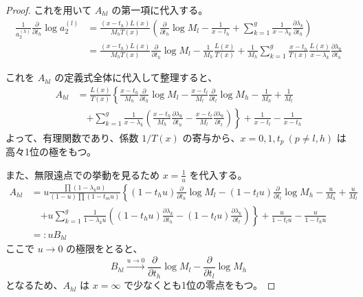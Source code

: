 \documentclass[paper=a4, fontsize=11pt]{jlreq} %
\newenvironment{story}{%
  \begin{mdframed}[
    backgroundcolor=red!5, %
    linewidth=0pt,         %
    innertopmargin=10pt,   %
    innerbottommargin=10pt,
    innerrightmargin=10pt, %
    innerleftmargin=10pt
  ]%
}{%
  \end{mdframed}%
}
\theoremstyle{break}
\theoremstyle{qa}
\begin{document}
\begin{story}
\begin{proof}
これを用いて $A_{hl}$ の第一項に代入する。
\begin{align*}
    \frac{1}{a_2^{(h)}} \frac{\partial}{\partial t_h} \log a_2^{(l)} 
    &= \frac{(x-t_h)L(x)}{M_h T(x)} \left( \frac{\partial}{\partial t_h} \log M_l - \frac{1}{x-t_h} + \sum_{k=1}^g \frac{1}{x-\lambda_k} \frac{\partial \lambda_k}{\partial t_h} \right) \\
    &= \frac{(x-t_h)L(x)}{M_h T(x)} \frac{\partial}{\partial t_h} \log M_l - \frac{1}{M_h} \frac{L(x)}{T(x)} + \frac{1}{M_h} \sum_{k=1}^g \frac{x-t_h}{T(x)} \frac{L(x)}{x-\lambda_k} \frac{\partial \lambda_k}{\partial t_h}
\end{align*}

これを $A_{hl}$ の定義式全体に代入して整理すると、
\begin{align*}
    A_{hl} &= \frac{L(x)}{T(x)} \left\{ \frac{x-t_h}{M_h} \frac{\partial}{\partial t_h} \log M_l - \frac{x-t_l}{M_l} \frac{\partial}{\partial t_l} \log M_h - \frac{1}{M_h} + \frac{1}{M_l} \right. \\
    &\quad \left. + \sum_{k=1}^g \frac{1}{x-\lambda_k} \left( \frac{x-t_h}{M_h} \frac{\partial \lambda_k}{\partial t_h} - \frac{x-t_l}{M_l} \frac{\partial \lambda_k}{\partial t_l} \right) \right\} + \frac{1}{x-t_l} - \frac{1}{x-t_h}
\end{align*}
よって、有理関数であり、係数 $1/T(x)$ の寄与から、$x=0, 1, t_p\ (p \neq l,h)$ は高々1位の極をもつ。

また、無限遠点での挙動を見るため $x=\frac{1}{u}$ を代入する。
\begin{align*}
    A_{hl} &= u \frac{\prod (1-\lambda_k u)}{(1-u) \prod (1-t_m u)} \left\{ (1-t_h u) \frac{\partial}{\partial t_h} \log M_l - (1-t_l u) \frac{\partial}{\partial t_l} \log M_h - \frac{u}{M_h} + \frac{u}{M_l} \right. \\
    &\quad \left. + u \sum_{k=1}^g \frac{1}{1-\lambda_k u} \left( (1-t_h u) \frac{\partial \lambda_k}{\partial t_h} - (1-t_l u) \frac{\partial \lambda_k}{\partial t_l} \right) \right\} + \frac{u}{1-t_l u} - \frac{u}{1-t_h u} \\
    &=: u B_{hl}
\end{align*}
ここで $u \to 0$ の極限をとると、
\begin{equation*}
    B_{hl} \xrightarrow{u \to 0} \frac{\partial}{\partial t_h} \log M_l - \frac{\partial}{\partial t_l} \log M_h
\end{equation*}
となるため、$A_{hl}$ は $x=\infty$ で少なくとも1位の零点をもつ。
\end{proof}
\end{story}
\end{document}
